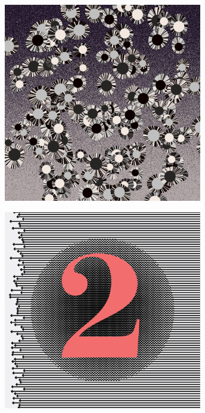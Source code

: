 \documentclass[11pt,twoside]{book}
\begin{document}
\begin{figure}[!ht]
\includegraphics[width=246pt]{warm-bw-3374052e-8dac-4167-8cec-e17cf98d5fce.png}
\end{figure}
\newpage
{}
\fancyfoot[CE,CO]{\fontsize{10}{12}\selectfont \thepage}
\begin{figure}[!ht]
\includegraphics[width=246pt]{salmon-lemon-f957cc6c-120c-4d18-9adf-a21e6ae6e5d8.png}
\end{figure}
\newpage
{}
\fancyfoot[CE,CO]{\fontsize{10}{12}\selectfont \thepage}
\end{document}
